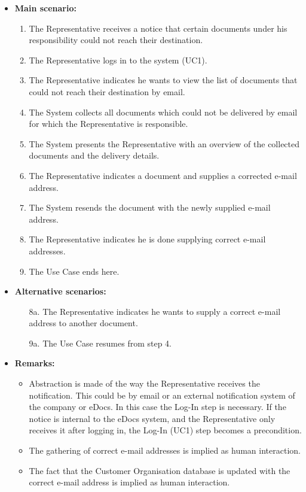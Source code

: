 \documentclass[a4paper,10pt]{article}
\begin{document}
\begin{itemize}
    \item \textbf{Main scenario:} 
    \begin{enumerate}
       \item The Representative receives a notice that certain documents under his responsibility could not reach their destination.
       \item The Representative logs in to the system (UC1).
       \item The Representative indicates he wants to view the list of documents that could not reach their destination by email.
       \item The System collects all documents which could not be delivered by email for which the Representative is responsible.
       \item The System presents the Representative with an overview of the collected documents and the delivery details.
       \item The Representative indicates a document and supplies a corrected e-mail address.
       \item The System resends the document with the newly supplied e-mail address.
       \item The Representative indicates he is done supplying correct e-mail addresses.
       \item The Use Case ends here.
    \end{enumerate}

    \item \textbf{Alternative scenarios:} 
    \begin{enumerate}
        \item [8a.] The Representative indicates he wants to supply a correct e-mail address to another document.
        \item [9a.] The Use Case resumes from step 4.
    \end{enumerate}
    
    \item \textbf{Remarks:}
        \begin{itemize}
            \item Abstraction is made of the way the Representative receives the notification. This could be by email or an external notification system of the company or eDocs. In this case the Log-In step is necessary. If the notice is internal to the eDocs system, and the Representative only receives it after logging in, the Log-In (UC1) step becomes a precondition.
            \item The gathering of correct e-mail addresses is implied as human interaction.
            \item The fact that the Customer Organisation database is updated with the correct e-mail address is implied as human interaction.
        \end{itemize}
\end{itemize}
\end{document}
